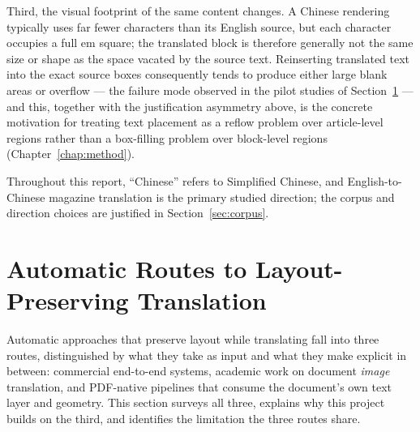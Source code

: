 Third, the visual footprint of the same content changes. A Chinese
rendering typically uses far fewer characters than its English source,
but each character occupies a full em square; the translated block is
therefore generally not the same size or shape as the space vacated by
the source text.
Reinserting translated text into the exact source boxes consequently
tends to produce either large blank areas or overflow --- the failure
mode observed in the pilot studies of Section~\ref{sec:background-routes} --- and
this, together with the justification asymmetry above, is the concrete
motivation for treating text placement as a reflow problem over
article-level regions rather than a box-filling problem over
block-level regions (Chapter~\ref{chap:method}).

Throughout this report, ``Chinese'' refers to Simplified Chinese, and
English-to-Chinese magazine translation is the primary studied
direction; the corpus and direction choices are justified in
Section~\ref{sec:corpus}.

\section{Automatic Routes to Layout-Preserving Translation}
\label{sec:background-routes}

Automatic approaches that preserve layout while translating fall into
three routes, distinguished by what they take as input and what they
make explicit in between: commercial end-to-end systems, academic work
on document \emph{image} translation, and PDF-native pipelines that
consume the document's own text layer and geometry. This section
surveys all three, explains why this project builds on the third, and
identifies the limitation the three routes share.

